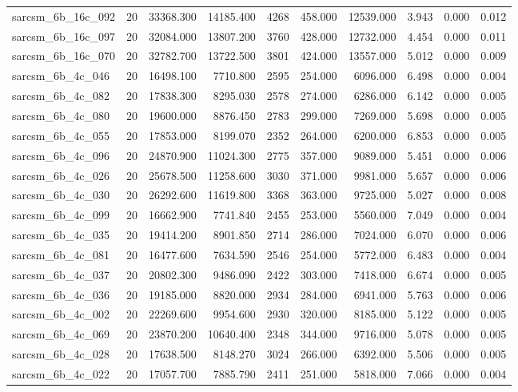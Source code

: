 \begin{tabular}{lrrrrrrrrr}
sarcsm\_6b\_16c\_092 & 20 & 33368.300 & 14185.400 & 4268 & 458.000 & 12539.000 & 3.943 & 0.000 & 0.012 \\
sarcsm\_6b\_16c\_097 & 20 & 32084.000 & 13807.200 & 3760 & 428.000 & 12732.000 & 4.454 & 0.000 & 0.011 \\
sarcsm\_6b\_16c\_070 & 20 & 32782.700 & 13722.500 & 3801 & 424.000 & 13557.000 & 5.012 & 0.000 & 0.009 \\
sarcsm\_6b\_4c\_046 & 20 & 16498.100 & 7710.800 & 2595 & 254.000 & 6096.000 & 6.498 & 0.000 & 0.004 \\
sarcsm\_6b\_4c\_082 & 20 & 17838.300 & 8295.030 & 2578 & 274.000 & 6286.000 & 6.142 & 0.000 & 0.005 \\
sarcsm\_6b\_4c\_080 & 20 & 19600.000 & 8876.450 & 2783 & 299.000 & 7269.000 & 5.698 & 0.000 & 0.005 \\
sarcsm\_6b\_4c\_055 & 20 & 17853.000 & 8199.070 & 2352 & 264.000 & 6200.000 & 6.853 & 0.000 & 0.005 \\
sarcsm\_6b\_4c\_096 & 20 & 24870.900 & 11024.300 & 2775 & 357.000 & 9089.000 & 5.451 & 0.000 & 0.006 \\
sarcsm\_6b\_4c\_026 & 20 & 25678.500 & 11258.600 & 3030 & 371.000 & 9981.000 & 5.657 & 0.000 & 0.006 \\
sarcsm\_6b\_4c\_030 & 20 & 26292.600 & 11619.800 & 3368 & 363.000 & 9725.000 & 5.027 & 0.000 & 0.008 \\
sarcsm\_6b\_4c\_099 & 20 & 16662.900 & 7741.840 & 2455 & 253.000 & 5560.000 & 7.049 & 0.000 & 0.004 \\
sarcsm\_6b\_4c\_035 & 20 & 19414.200 & 8901.850 & 2714 & 286.000 & 7024.000 & 6.070 & 0.000 & 0.006 \\
sarcsm\_6b\_4c\_081 & 20 & 16477.600 & 7634.590 & 2546 & 254.000 & 5772.000 & 6.483 & 0.000 & 0.004 \\
sarcsm\_6b\_4c\_037 & 20 & 20802.300 & 9486.090 & 2422 & 303.000 & 7418.000 & 6.674 & 0.000 & 0.005 \\
sarcsm\_6b\_4c\_036 & 20 & 19185.000 & 8820.000 & 2934 & 284.000 & 6941.000 & 5.763 & 0.000 & 0.006 \\
sarcsm\_6b\_4c\_002 & 20 & 22269.600 & 9954.600 & 2930 & 320.000 & 8185.000 & 5.122 & 0.000 & 0.005 \\
sarcsm\_6b\_4c\_069 & 20 & 23870.200 & 10640.400 & 2348 & 344.000 & 9716.000 & 5.078 & 0.000 & 0.005 \\
sarcsm\_6b\_4c\_028 & 20 & 17638.500 & 8148.270 & 3024 & 266.000 & 6392.000 & 5.506 & 0.000 & 0.005 \\
sarcsm\_6b\_4c\_022 & 20 & 17057.700 & 7885.790 & 2411 & 251.000 & 5818.000 & 7.066 & 0.000 & 0.004 \\

\end{tabular}
